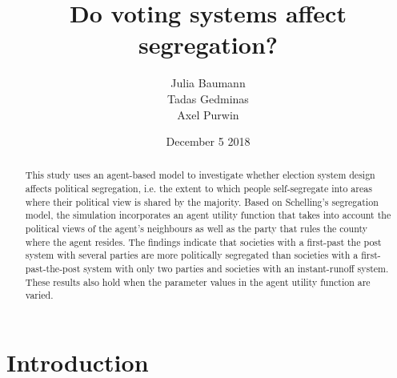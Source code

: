 \documentclass[12pt, a4paper]{article}
\title{{\Huge Do voting systems affect segregation?}\\
	\vspace{3mm}{\Large Term Paper \\ Software Engineering for Economists}%
}
\author{Julia Baumann\\ Tadas Gedminas\\Axel Purwin}
\date{December 5 2018}
\begin{document}
	
	\maketitle \thispagestyle{empty}

	\vspace{10mm}
	\begin{abstract}
		
		\setlength{\baselineskip}{10.5pt} 
		
		\vspace{0.5cm} 
		\noindent  This study uses an agent-based model to investigate whether election system design affects political segregation, i.e. the extent to which people self-segregate into areas where their political view is shared by the majority. Based on Schelling's segregation model, the simulation incorporates an agent utility function that takes into account the political views of the agent's neighbours as well as the party that rules the county where the agent resides. The findings indicate that societies with a first-past the post system with several parties are more politically segregated than societies with a first-past-the-post system with only two parties and societies with an instant-runoff system. These results also hold when the parameter values in the agent utility function are varied.   
		\vspace{0.5cm} 
		
	\end{abstract}
	
	\newpage
	
	
	\setcounter{page}{1}%
	
	
	\section{\label{sec_intro}Introduction}
	
\end{document}
